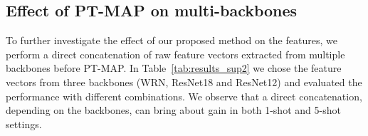 \documentclass[twoside]{article}
\begin{document}
\begin{table}[h]
    \caption{1-shot and 5-shot accuracy (dataset: miniImagenet) on baseline and our proposed PT-MAP.}
    \centering
    \label{tab:results_sup1}
\end{table}

\subsection{Effect of PT-MAP on multi-backbones}

To further investigate the effect of our proposed method on the features, we perform a direct concatenation of raw feature vectors extracted from multiple backbones before PT-MAP. In Table~\ref{tab:results_sup2} we chose the feature vectors from three backbones (WRN, ResNet18 and ResNet12) and evaluated the performance with different combinations. We observe that a direct concatenation, depending on the backbones, can bring about  gain in both 1-shot and 5-shot settings.

\begin{table}[h]
    \caption{1-shot and 5-shot accuracy (datasets: miniImageNet, CUB and CIFAR-FS) on our proposed PT-MAP with multi-backbones ('+' denotes a concatenation of backbone features).}
    \centering
    \label{tab:results_sup2}
\end{table}

\vfill
\end{document}
